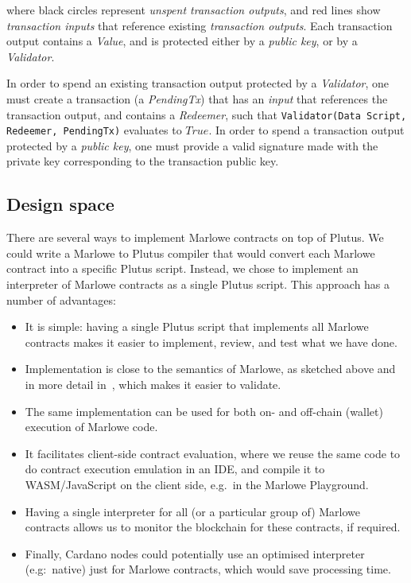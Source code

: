 \documentclass[runningheads]{llncs}
\begin{document}
\noindent
where black circles represent \emph{unspent transaction outputs}, and red lines show \emph{transaction inputs}
that reference existing \emph{transaction outputs}.
Each transaction output contains a \emph{Value}, and is protected either by a \emph{public key},
or by a \emph{Validator}.

In order to spend an existing transaction output protected by a \emph{Validator},
one must create a transaction (a \emph{PendingTx}) that has an \emph{input} that references the transaction output,
and contains a \emph{Redeemer}, such that \texttt{Validator(Data Script, Redeemer, PendingTx)} evaluates to $True$.
In order to spend a transaction output protected by a \emph{public key}, one must provide a valid signature
made with the private key corresponding to the transaction public key.


\subsection{Design space}

There are several ways to implement Marlowe contracts on top of Plutus.
We could write a Marlowe to Plutus compiler that would convert
each Marlowe contract into a specific Plutus script.
Instead, we chose to implement an interpreter of Marlowe contracts as a single Plutus script.
This approach has a number of advantages:
\begin{itemize}
\item It is simple: having a single Plutus script that implements all Marlowe contracts
makes it easier to implement, review, and test what we have done.
\item Implementation is close to the semantics of Marlowe, as sketched above and in more detail in~\cite{isola-marlowe},
which makes it easier to validate.
\item The same implementation can be used for both on- and off-chain (wallet) execution of Marlowe code.
\item It facilitates client-side contract evaluation, where we reuse the same code
to do contract execution emulation in an IDE, and compile it to WASM/JavaScript on the client side,
e.g.\ in the Marlowe Playground.
\item Having a single interpreter for all (or a particular group of) Marlowe contracts allows us
  to monitor the blockchain for these contracts, if required.
\item Finally, Cardano nodes could potentially use an optimised interpreter (e.g:~native) just for Marlowe contracts, which would save processing time.
\end{itemize}
\end{document}
